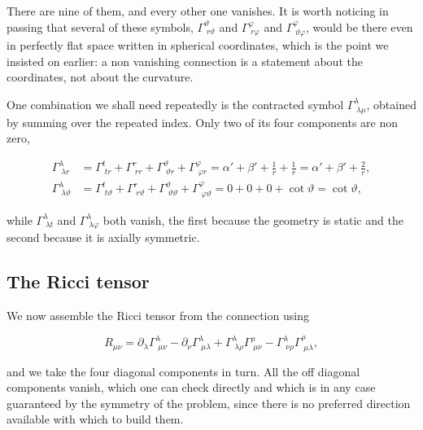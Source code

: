         There are nine of them, and every other one vanishes. It is worth noticing in passing that several of these symbols, $\Gamma^{\vartheta}_{\;r\vartheta}$ and $\Gamma^{\varphi}_{\;r\varphi}$ and $\Gamma^{\varphi}_{\;\vartheta\varphi}$, would be there even in perfectly flat space written in spherical coordinates, which is the point we insisted on earlier: a non vanishing connection is a statement about the coordinates, not about the curvature.

        One combination we shall need repeatedly is the contracted symbol $\Gamma^{\lambda}_{\;\lambda\mu}$, obtained by summing over the repeated index. Only two of its four components are non zero,

        \begin{align}\label{eq:ContractedGamma}
            \Gamma^{\lambda}_{\;\lambda r} &= \Gamma^{t}_{\;tr} + \Gamma^{r}_{\;rr} + \Gamma^{\vartheta}_{\;\vartheta r} + \Gamma^{\varphi}_{\;\varphi r} = \alpha' + \beta' + \frac{1}{r} + \frac{1}{r} = \alpha' + \beta' + \frac{2}{r},\\
            \Gamma^{\lambda}_{\;\lambda\vartheta} &= \Gamma^{t}_{\;t\vartheta} + \Gamma^{r}_{\;r\vartheta} + \Gamma^{\vartheta}_{\;\vartheta\vartheta} + \Gamma^{\varphi}_{\;\varphi\vartheta} = 0 + 0 + 0 + \cot\vartheta = \cot\vartheta,\nonumber
        \end{align}

        while $\Gamma^{\lambda}_{\;\lambda t}$ and $\Gamma^{\lambda}_{\;\lambda\varphi}$ both vanish, the first because the geometry is static and the second because it is axially symmetric.

    \subsection{The Ricci tensor}

        We now assemble the Ricci tensor from the connection using

        \begin{equation}\label{eq:RicciDefSchw}
            R_{\mu\nu} = \partial_{\lambda}\Gamma^{\lambda}_{\;\mu\nu} - \partial_{\nu}\Gamma^{\lambda}_{\;\mu\lambda} + \Gamma^{\lambda}_{\;\lambda\rho}\Gamma^{\rho}_{\;\mu\nu} - \Gamma^{\lambda}_{\;\nu\rho}\Gamma^{\rho}_{\;\mu\lambda},
        \end{equation}

        and we take the four diagonal components in turn. All the off diagonal components vanish, which one can check directly and which is in any case guaranteed by the symmetry of the problem, since there is no preferred direction available with which to build them.

